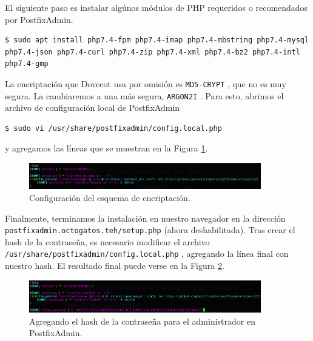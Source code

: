 \documentclass{article}
\newcommand{\ttt}[1]{%
\texttt{#1}%
}
\begin{document}
El siguiente paso es instalar alg\'unos m\'odulos
de PHP requeridos o recomendados por PostfixAdmin.
\begin{lstlisting}
$ sudo apt install php7.4-fpm php7.4-imap php7.4-mbstring php7.4-mysql php7.4-json php7.4-curl php7.4-zip php7.4-xml php7.4-bz2 php7.4-intl php7.4-gmp
\end{lstlisting}

La encriptaci\'on que Dovecot usa por omisi\'on
es \ttt{MD5-CRYPT}, que no es muy segura.  La cambiaremos
a una m\'as segura, \ttt{ARGON2I}.   Para esto,
abrimos el archivo de configuraci\'on local de
PostfixAdmin
\begin{lstlisting}
$ sudo vi /usr/share/postfixadmin/config.local.php
\end{lstlisting}
y agregamos las l\'ineas que se muestran en la
Figura \ref{fig:email-argon}.

\begin{figure}[H]
  \centering
  \includegraphics[width=0.9\textwidth]{email/argon}
  \caption{Configuraci\'on del esquema de encriptaci\'on.}
  \label{fig:email-argon}
\end{figure}
Finalmente, terminamos la instalaci\'on en nuestro
navegador en la direcci\'on
\ttt{postfixadmin.octogatos.teh/setup.php} (ahora
deshabilitada).   Tras crear el hash de la contrase\~na,
es necesario modificar el archivo \\
\ttt{/usr/share/postfixadmin/config.local.php}, agregando
la l\'inea final con nuestro hash.   El resultado final
puede verse en la Figura \ref{fig:email-hash}.
\begin{figure}[H]
  \centering
  \includegraphics[width=0.9\textwidth]{email/hash}
  \caption{Agregando el hash de la contrase\~na para el
           administrador en PostfixAdmin.}
  \label{fig:email-hash}
\end{figure}
\end{document}
